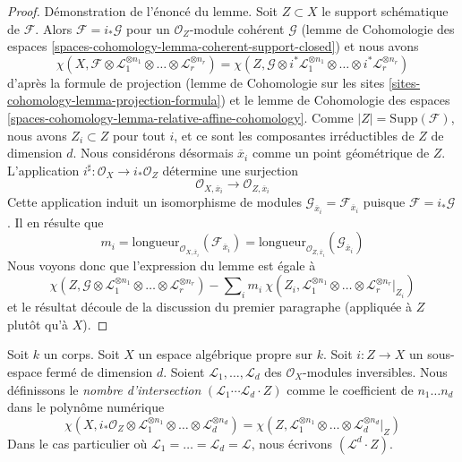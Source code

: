 \begin{proof}
\medskip\noindent
Démonstration de l'énoncé du lemme.
Soit $Z \subset X$ le support schématique de $\mathcal{F}$.
Alors $\mathcal{F} = i_*\mathcal{G}$ pour un
$\mathcal{O}_Z$-module cohérent $\mathcal{G}$
(lemme de Cohomologie des espaces
\ref{spaces-cohomology-lemma-coherent-support-closed})
et nous avons
$$
\chi(X, \mathcal{F} \otimes
\mathcal{L}_1^{\otimes n_1} \otimes \ldots \otimes
\mathcal{L}_r^{\otimes n_r}) =
\chi(Z, \mathcal{G} \otimes
i^*\mathcal{L}_1^{\otimes n_1} \otimes \ldots \otimes
i^*\mathcal{L}_r^{\otimes n_r})
$$
d'après la formule de projection
(lemme de Cohomologie sur les sites \ref{sites-cohomology-lemma-projection-formula})
et le lemme de Cohomologie des espaces
\ref{spaces-cohomology-lemma-relative-affine-cohomology}.
Comme $|Z| = \text{Supp}(\mathcal{F})$, nous avons $Z_i \subset Z$
pour tout $i$, et ce sont les composantes irréductibles
de $Z$ de dimension $d$. Nous considérons désormais $\overline{x}_i$
comme un point géométrique de $Z$. L'application
$i^\sharp : \mathcal{O}_X \to i_*\mathcal{O}_Z$
détermine une surjection
$$
\mathcal{O}_{X, \overline{x}_i} \to \mathcal{O}_{Z, \overline{x}_i}
$$
Cette application induit un isomorphisme de modules
$\mathcal{G}_{\overline{x}_i} = \mathcal{F}_{\overline{x}_i}$
puisque $\mathcal{F} = i_*\mathcal{G}$. Il en résulte que
$$
m_i = \text{longueur}_{\mathcal{O}_{X, \overline{x}_i}}
(\mathcal{F}_{\overline{x}_i}) =
\text{longueur}_{\mathcal{O}_{Z, \overline{x}_i}}
(\mathcal{G}_{\overline{x}_i})
$$
Nous voyons donc que l'expression du lemme est égale à
$$
\chi(Z, \mathcal{G} \otimes \mathcal{L}_1^{\otimes n_1} \otimes \ldots \otimes
\mathcal{L}_r^{\otimes n_r}) -
\sum\nolimits_i
m_i\ \chi(Z_i, \mathcal{L}_1^{\otimes n_1} \otimes \ldots \otimes
\mathcal{L}_r^{\otimes n_r}|_{Z_i})
$$
et le résultat découle de la discussion du premier paragraphe
(appliquée à $Z$ plutôt qu'à $X$).
\end{proof}

\begin{definition}
\label{definition-intersection-number}
Soit $k$ un corps. Soit $X$ un espace algébrique propre sur $k$. Soit
$i : Z \to X$ un sous-espace fermé de dimension $d$. Soient
$\mathcal{L}_1, \ldots, \mathcal{L}_d$ des
$\mathcal{O}_X$-modules inversibles. Nous définissons le {\it nombre d'intersection}
$(\mathcal{L}_1 \cdots \mathcal{L}_d \cdot Z)$
comme le coefficient de $n_1 \ldots n_d$ dans le polynôme numérique
$$
\chi(X, i_*\mathcal{O}_Z \otimes \mathcal{L}_1^{\otimes n_1} \otimes
\ldots \otimes \mathcal{L}_d^{\otimes n_d}) =
\chi(Z, \mathcal{L}_1^{\otimes n_1} \otimes
\ldots \otimes \mathcal{L}_d^{\otimes n_d}|_Z)
$$
Dans le cas particulier
où $\mathcal{L}_1 = \ldots = \mathcal{L}_d = \mathcal{L}$,
nous écrivons $(\mathcal{L}^d \cdot Z)$.
\end{definition}

